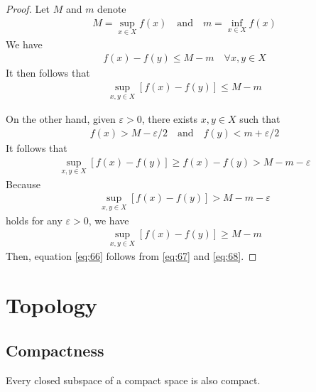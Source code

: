 \documentclass[thmcnt=section, 12pt]{my-elegantbook}
\begin{document}
\begin{proof}
    Let $M$ and $m$ denote 
    \begin{align*}
        M = \sup_{x \in X} f(x)
        \quad\text{and}\quad
        m = \inf_{x \in X} f(x)
    \end{align*}
    We have 
    \begin{align*}
        f(x) - f(y) \leq M - m
        \quad \forall x,y \in X
    \end{align*}
    It then follows that 
    \begin{align}
        \sup_{x,y \in X} [f(x) - f(y)]
        \leq M - m
        \label{eq:67}
    \end{align}

    On the other hand, given $\varepsilon > 0$, there exists $x, y \in X$ such that 
    \begin{align}
        f(x) > M - \varepsilon / 2
        \quad \text{and} \quad 
        f(y) < m + \varepsilon / 2
    \end{align} 
    It follows that 
    \begin{align*}
        \sup_{x,y \in X} [f(x) - f(y)]
        \geq f(x) - f(y)
        > M - m - \varepsilon
    \end{align*}
    Because 
    \begin{align*}
        \sup_{x,y \in X} [f(x) - f(y)]
        > M - m - \varepsilon
    \end{align*}
    holds for any $\varepsilon > 0$, we have 
    \begin{align}
        \sup_{x,y \in X} [f(x) - f(y)]
        \geq M - m
        \label{eq:68}
    \end{align}
    Then, equation \eqref{eq:66} follows from \eqref{eq:67} and \eqref{eq:68}.
\end{proof}


\chapter{Topology}


\section{Compactness}


\begin{theorem} \label{thm:90}
	Every closed subspace of a compact space is also compact.
\end{theorem}
\end{document}
